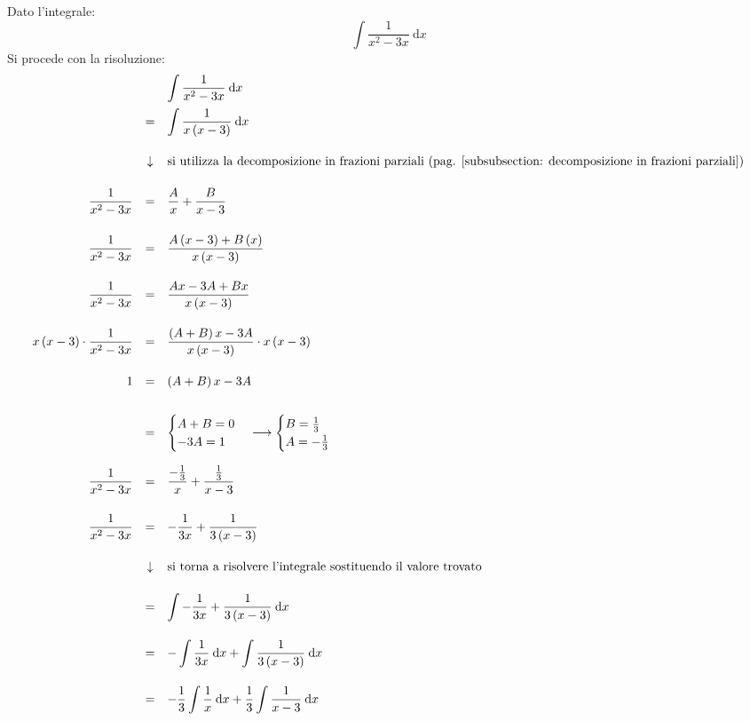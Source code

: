 \documentclass[a4paper]{article}
\begin{document}
	\noindent
	Dato l'integrale:
	\begin{equation*}
		\displaystyle \int\dfrac{1}{x^{2} - 3x} \: \mathrm{d}x
	\end{equation*}
	Si procede con la risoluzione:
	\begin{equation*}
		\begin{array}{rcl}
			&& \displaystyle \int\dfrac{1}{x^{2} - 3x} \: \mathrm{d}x \\ [1em]
			&=& \displaystyle \int\dfrac{1}{x\left(x-3\right)} \: \mathrm{d}x \\ [2em]
			&\downarrow& \text{si utilizza la decomposizione in frazioni parziali (pag. \pageref{subsubsection: decomposizione in frazioni parziali})} \\ [1.5em]
			\dfrac{1}{x^{2}-3x} &=& \dfrac{A}{x} + \dfrac{B}{x-3} \\ [2em]
			\dfrac{1}{x^{2}-3x} &=& \dfrac{A\left(x-3\right) + B\left(x\right)}{x\left(x-3\right)} \\ [2em]
			\dfrac{1}{x^{2}-3x} &=& \dfrac{Ax - 3A + Bx}{x\left(x-3\right)} \\ [2em]
			x\left(x-3\right) \cdot \dfrac{1}{x^{2}-3x} &=& \dfrac{\left(A + B\right)x - 3A}{x\left(x-3\right)} \cdot x\left(x-3\right) \\ [2em]
			1 &=& \left(A + B\right)x - 3A \\ [2em]
			&=& \begin{cases}
				A + B = 0 \\
				-3A = 1
			\end{cases} \longrightarrow
			\begin{cases}
				B = \frac{1}{3} \\
				A = -\frac{1}{3}
			\end{cases} \\ [2em]
			\dfrac{1}{x^{2}-3x} &=& \dfrac{-\frac{1}{3}}{x} + \dfrac{\frac{1}{3}}{x-3} \\ [2em]
			\dfrac{1}{x^{2}-3x} &=& -\dfrac{1}{3x} + \dfrac{1}{3\left(x-3\right)} \\ [2em]
			&\downarrow& \text{si torna a risolvere l'integrale sostituendo il valore trovato} \\ [1.5em]
			&=& \displaystyle\int -\dfrac{1}{3x} + \dfrac{1}{3\left(x-3\right)} \: \mathrm{d}x \\ [2em]
			&=& \displaystyle-\int \dfrac{1}{3x} \: \mathrm{d}x + \displaystyle\int \dfrac{1}{3\left(x-3\right)} \: \mathrm{d}x \\ [2em]
			&=& \displaystyle -\dfrac{1}{3}\int \dfrac{1}{x} \: \mathrm{d}x + \displaystyle\dfrac{1}{3}\int \dfrac{1}{x-3} \: \mathrm{d}x \\ [2em]
		\end{array}
	\end{equation*}\newpage
\end{document}
